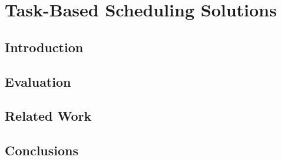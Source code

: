 \chapter{Task-Based Scheduling Solutions}
\section{Introduction}
\label{sec:intro}




%

\section{Evaluation}
\label{sec:evaluation}


\section{Related Work}
\label{sec:related}


\section{Conclusions}
\label{sec:conclusions}


